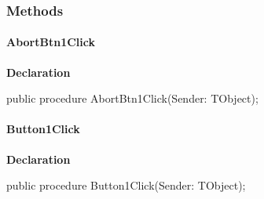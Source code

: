\documentclass{report}
\newif\ifpdf
\begin{document}
\subsubsection*{\large{\textbf{Methods}}\normalsize\hspace{1ex}\hfill}
\paragraph*{AbortBtn1Click}\hspace*{\fill}

\label{imainunit.TIWizFrm-AbortBtn1Click}
\begin{list}{}{
\setlength{\itemindent}{0cm}
\setlength{\listparindent}{0cm}
\setlength{\leftmargin}{\evensidemargin}
\addtolength{\leftmargin}{\tmplength}
\settowidth{\labelsep}{X}
\addtolength{\leftmargin}{\labelsep}
\setlength{\labelwidth}{\tmplength}
}
\item[\textbf{Declaration}\hfill]
\ifpdf
\begin{flushleft}
\fi
\begin{ttfamily}
public procedure AbortBtn1Click(Sender: TObject);\end{ttfamily}

\ifpdf
\end{flushleft}
\fi

\end{list}
\paragraph*{Button1Click}\hspace*{\fill}

\label{imainunit.TIWizFrm-Button1Click}
\begin{list}{}{
\setlength{\itemindent}{0cm}
\setlength{\listparindent}{0cm}
\setlength{\leftmargin}{\evensidemargin}
\addtolength{\leftmargin}{\tmplength}
\settowidth{\labelsep}{X}
\addtolength{\leftmargin}{\labelsep}
\setlength{\labelwidth}{\tmplength}
}
\item[\textbf{Declaration}\hfill]
\ifpdf
\begin{flushleft}
\fi
\begin{ttfamily}
public procedure Button1Click(Sender: TObject);\end{ttfamily}

\ifpdf
\end{flushleft}
\fi

\end{list}
\end{document}
